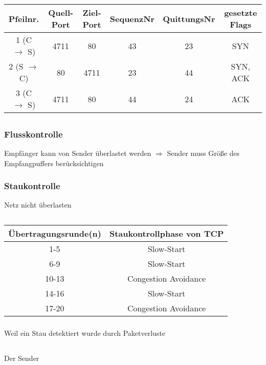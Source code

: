 \documentclass[a4paper]{article}
\begin{document}
\subsection{}
\begin{tabular}{|c|c|c|c|c|c|}\hline
Pfeilnr. & Quell-Port & Ziel-Port & SequenzNr & QuittungsNr & gesetzte Flags \\ \hline
1 (C $\rightarrow$ S)&4711&80&43&23&SYN\\ \hline
2 (S $\rightarrow$ C)&80&4711&23&44&SYN, ACK\\ \hline
3 (C $\rightarrow$ S)&4711&80&44&24&ACK\\ \hline
\end{tabular}
\subsection{}
\subsubsection{Flusskontrolle}
Empfänger kann von Sender überlastet werden
$\Rightarrow$ Sender muss Größe des Empfangpuffers berücksichtigen
\subsubsection{Staukontrolle}
Netz nicht überlasten
\subsection{}
\subsubsection{}
\begin{tabular}{|c|c|}\hline
Übertragungsrunde(n) & Staukontrollphase von TCP \\ \hline
1-5 & Slow-Start\\ \hline
6-9 & Slow-Start\\ \hline
10-13 & Congestion Avoidance\\ \hline
14-16 & Slow-Start\\ \hline
17-20 & Congestion Avoidance\\ \hline
\end{tabular}
\subsubsection{}
Weil ein Stau detektiert wurde durch Paketverluste
\subsection{}
Der Sender
\end{document}
